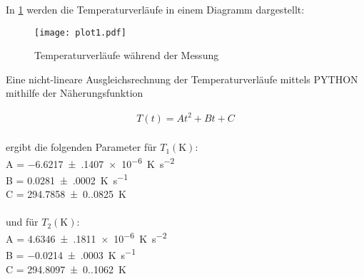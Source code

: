 


In \ref{fig:plot} werden die Temperaturverläufe in einem Diagramm dargestellt:

\begin{figure}
  \centering
  \texttt{[image: plot1.pdf]}
  \caption{Temperaturverläufe während der Messung}
  \label{fig:plot}
\end{figure}

Eine nicht-lineare Ausgleichsrechnung der Temperaturverläufe mittels PYTHON mithilfe der Näherungsfunktion

\begin{align*} 
  T(t) = At^2 + Bt + C 
\end{align*}
\\
ergibt die folgenden Parameter für $T_{1} (\unit{\kelvin})$: \\
A = \qty{-6.6217(1407)e-6}{\unit[per-mode=reciprocal]{\kelvin\per\second\squared}} \\
B = \qty{0.0281(0002)}{\unit[per-mode=reciprocal]{\kelvin\per\second}} \\
C = \qty{294.7858(0.0825)}{\unit\kelvin} \\
\\
und für $T_{2} (\unit{\kelvin})$: \\
A = \qty{4.6346(1811)e-6}{\unit[per-mode=reciprocal]{\kelvin\per\second\squared}} \\
B = \qty{-0.0214(0003)}{\unit[per-mode=reciprocal]{\kelvin\per\second}} \\
C = \qty{294.8097(0.1062)}{\unit\kelvin} \\

